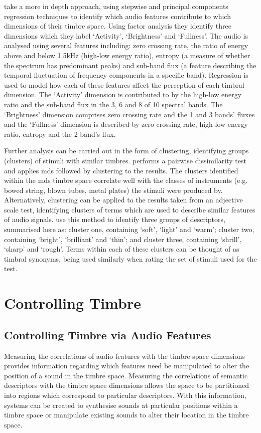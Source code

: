 		\citet{alluri2010exploring} take a more in depth approach, using stepwise and principal components
		regression techniques to identify which audio features contribute to which dimensions of their timbre
		space. Using factor analysis they identify three dimensions which they label `Activity', `Brightness' and
		`Fullness'. The audio is analysed using several features including: zero crossing rate, the ratio of energy
		above and below 1.5kHz (high-low energy ratio), entropy (a measure of whether the spectrum has predominant
		peaks) and sub-band flux (a feature describing the temporal fluctuation of frequency components in a
		specific band). Regression is used to model how each of these features affect the perception of each
		timbral dimension. The `Activity' dimension is contributed to by the high-low energy ratio and the sub-band
		flux in the 3, 6 and 8 of 10 spectral bands. The `Brightness' dimension
		comprises zero crossing rate and the 1 and 3 bands' fluxes and the `Fullness' dimension
		is described by zero crossing rate, high-low energy ratio, entropy and the 2 band's flux.

		Further analysis can be carried out in the form of clustering, identifying groups (clusters) of stimuli
		with similar timbres. \citet{lakatos2000a} performs a pairwise dissimilarity test and applies
		\acrshort{mds} followed by clustering to the results. The clusters identified within the \acrshort{mds}
		timbre space correlate well with the classes of instruments (e.g. bowed string, blown tubes, metal plates)
		the stimuli were produced by.  Alternatively, clustering can be applied to the results taken from an
		adjective scale test, identifying clusters of terms which are used to describe similar features of audio
		signals.  \citet{zacharakis2011an2} use this method to identify three groups of descriptors, summarised
		here as: cluster one, containing `soft', `light' and `warm'; cluster two, containing `bright', `brilliant'
		and `thin'; and cluster three, containing `shrill', `sharp' and `rough'. Terms within each of these
		clusters can be thought of as timbral synonyms, being used similarly when rating the set of stimuli used
		for the test.

\section{Controlling Timbre}
\label{sec:Timbre-Control}
	\subsection{Controlling Timbre via Audio Features}
	\label{sec:Timbre-Control-TimbreSpaces}
		Measuring the correlations of audio features with the timbre space dimensions provides information
		regarding which features need be manipulated to alter the position of a sound in the timbre space.
		Measuring the correlations of semantic descriptors with the timbre space dimensions allows the space to be
		partitioned into regions which correspond to particular descriptors. With this information, systems can be
		created to synthesise sounds at particular positions within a timbre space or manipulate existing sounds to
		alter their location in the timbre space.

